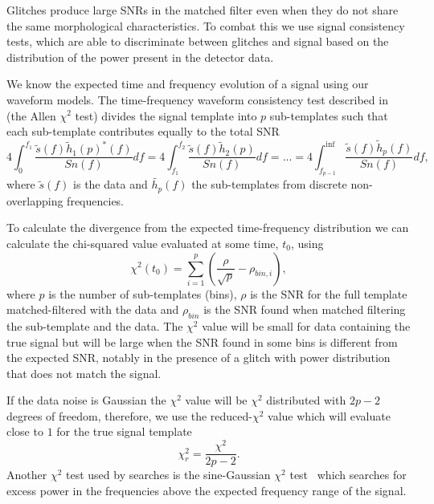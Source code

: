 Glitches produce large SNRs in the matched filter even when they do not share the same morphological characteristics. To combat this we use signal consistency tests, which are able to discriminate between glitches and signal based on the distribution of the power present in the detector data.

We know the expected time and frequency evolution of a \gwadj signal using our waveform models. The time-frequency waveform consistency test described in~\cite{Allen_Chi:2005} (the Allen $\chi^{2}$ test) divides the signal template into $p$ sub-templates such that each sub-template contributes equally to the total SNR
%
\begin{equation}
    4 \int^{f_{1}}_{0}\frac{\tilde{s}(f) \tilde{h}_{1}(p)^*(f)}{Sn(f)}df = 4 \int^{f_{2}}_{f_{1}}\frac{\tilde{s}(f) \tilde{h}_{2}(p)}{Sn(f)}df = ... =  4 \int^{\inf}_{f_{p-1}}\frac{\tilde{s}(f) \tilde{h}_{p}(f)}{Sn(f)}df ,
\end{equation}
%
where $\tilde{s}(f)$ is the data and $\tilde{h_{p}}(f)$ the sub-templates from discrete non-overlapping frequencies.

To calculate the divergence from the expected time-frequency distribution we can calculate the chi-squared value evaluated at some time, $t_{0}$, using
%
\begin{equation}
    \chi^{2}(t_{0}) = \sum^{p}_{i=1} \left(\frac{\rho}{\sqrt{p}} - \rho_{bin, i}\right),
\end{equation}
%
where $p$ is the number of sub-templates (bins), $\rho$ is the SNR for the full template matched-filtered with the data and $\rho_{bin}$ is the SNR found when matched filtering the sub-template and the data. The $\chi^{2}$ value will be small for data containing the true signal but will be large when the SNR found in some bins is different from the expected SNR, notably in the presence of a glitch with power distribution that does not match the signal.

If the data noise is Gaussian the $\chi^{2}$ value will be $\chi^{2}$ distributed with $2p - 2$ degrees of freedom, therefore, we use the reduced-$\chi^{2}$ value which will evaluate close to $1$ for the true signal template
%
\begin{equation}
    \chi_{r}^{2} = \frac{\chi^{2}}{2p-2}.
    \label{2:eq:reduced_chisq}
\end{equation}
%
Another $\chi^{2}$ test used by \gwadj searches is the sine-Gaussian $\chi^{2}$ test~\cite{PyCBC_sg:2018} which searches for excess power in the frequencies above the expected frequency range of the signal.

